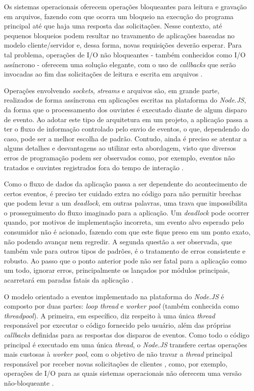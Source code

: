 \documentclass[12pt]{article}
\begin{document}
Os sistemas operacionais oferecem operações bloqueantes para leitura e gravação em arquivos, fazendo com que ocorra
um bloqueio na execução do programa principal até que haja uma resposta das solicitações. Nesse contexto, até pequenos
bloqueios podem resultar no travamento de aplicações baseadas no modelo cliente/servidor e, dessa forma, novas requisições
deverão esperar. Para tal problema, operações de I/O não bloqueantes - também conhecidos como I/O assíncrono - oferecem
uma solução elegante, com o uso de \textit{callbacks} que serão invocadas ao fim das solicitações 
de leitura e escrita em arquivos \cite{UDESC}.

Operações envolvendo \textit{sockets}, \textit{streams} e arquivos são, em grande parte, 
realizados de forma assíncrona em aplicações escritas na plataforma do \textit{Node.JS}, da forma que o processamento
dos ouvintes é executado diante de algum disparo de evento. \cite{MFO} Ao adotar este tipo de arquitetura em um projeto, 
a aplicação passa a ter o fluxo de informação controlado pelo envio de eventos, o que, dependendo do caso, pode ser a melhor 
escolha de padrão. Contudo, ainda é preciso se atentar a alguns detalhes e desvantagens ao utilizar esta abordagem,
visto que diversos erros de programação podem ser observados como, por exemplo, eventos não tratados e ouvintes
registrados fora do tempo de interação \cite[p. 28]{DIOGORESENDE}.

Como o fluxo de dados da aplicação passa a ser dependente do acontecimento de certos eventos, é preciso ter cuidado 
extra no código para não permitir brechas que podem levar a um \textit{deadlock},
em outras palavras, uma trava que impossibilita o prosseguimento do fluxo imaginado para a aplicação. Um 
\textit{deadlock} pode ocorrer quando, por motivos de implementação incorreta, um evento alvo esperado pelo
consumidor não é acionado, fazendo com que este fique preso em um ponto exato, não podendo avançar nem regredir.
A segunda questão a ser observada, que também vale para outros tipos de padrões, é o tratamento de erros consistente
e robusto. Ao passo que o ponto anterior pode não ser fatal para a aplicação como um todo, ignorar erros, principalmente
os lançados por módulos principais, acarretará em paradas fatais da aplicação \cite[p. 28]{DIOGORESENDE}.

O modelo orientado a eventos implementado na plataforma do \textit{Node.JS} é composto por duas partes: 
\textit{loop thread} e \textit{worker pool} (também conhecida como \textit{threadpool}). A primeira, em específico, 
diz respeito à uma única \textit{thread} responsável por executar o código fornecido pelo usuário, além 
das próprias \textit{callbacks} definidas para as respostas dos disparos de eventos. Como todo o código principal 
é executado em uma única \textit{thread}, o \textit{Node.JS} transfere certas operações mais custosas à \textit{worker pool}, 
com o objetivo de não travar a \textit{thread} principal responsável por receber novas solicitações de 
clientes \cite{BUGS} \cite{ATOMICITY}, 
como, por exemplo, operações de I/O para as quais sistemas operacionais não oferecem uma versão não-bloqueante 
\cite{NODEBLOCKEVENTLOOP}. 
\end{document}
